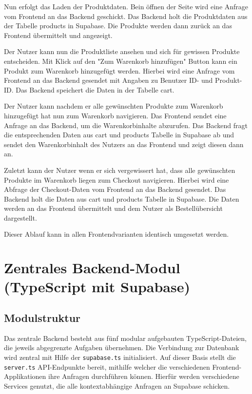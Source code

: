 \documentclass[oneside]{ausarbeitung}
\begin{document}
Nun erfolgt das Laden der Produktdaten. Bein öffnen der Seite wird eine Anfrage vom Frontend an das Backend geschickt. Das Backend holt die Produktdaten aus der Tabelle products in Supabase. Die Produkte werden dann zurück an das Frontend übermittelt und angezeigt.

Der Nutzer kann nun die Produktliste ansehen und sich für gewissen Produkte entscheiden. Mit Klick auf den "Zum Warenkorb hinzufügen" Button kann ein Produkt zum Warenkorb hinzugefügt werden. Hierbei wird eine Anfrage vom Frontend an das Backend gesendet mit Angaben zu Benutzer ID- und Produkt-ID. Das Backend speichert die Daten in der Tabelle cart. 

Der Nutzer kann nachdem er alle gewünschten Produkte zum Warenkorb hinzugefügt hat nun zum Warenkorb navigieren. Das Frontend sendet eine Anfrage an das Backend, um die Warenkorbinhalte abzurufen. Das Backend fragt die entsprechenden Daten aus cart und products Tabelle in Supabase ab und sendet den Warenkorbinhalt des Nutzers an das Frontend und zeigt diesen dann an. 

Zuletzt kann der Nutzer wenn er sich vergewissert hat, dass alle gewünschten Produkte im Warenkorb liegen zum Checkout navigieren. Hierbei wird eine Abfrage der Checkout-Daten vom Frontend an das Backend gesendet. Das Backend holt die Daten aus cart und products Tabelle in Supabase. Die Daten werden an das Frontend übermittelt und dem Nutzer als Bestellübersicht dargestellt.

Dieser Ablauf kann in allen Frontendvarianten identisch umgesetzt werden. 


\section{Zentrales Backend-Modul (TypeScript mit Supabase)}
\subsection{Modulstruktur}

Das zentrale Backend besteht aus fünf modular aufgebauten TypeScript-Dateien, die jeweils abgegrenzte Aufgaben übernehmen. Die Verbindung zur Datenbank wird zentral mit Hilfe der \texttt{supabase.ts} initialisiert. Auf dieser Basis stellt die \texttt{server.ts} API-Endpunkte bereit, mithilfe welcher die verschiedenen Frontend-Applikationen ihre Anfragen durchführen können. Hierfür werden verschiedene Services genutzt, die alle kontextabhängige Anfragen an Supabase schicken.
\end{document}
